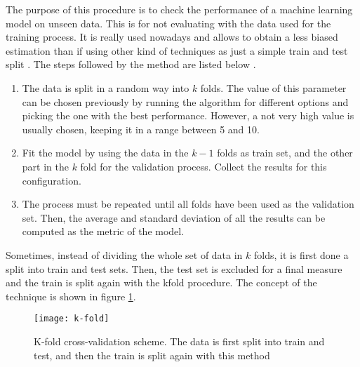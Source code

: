 	The purpose of this procedure is to check the performance of a machine learning model on unseen data. This is for not evaluating with the data used for the training process. It is really used nowadays and allows to obtain a less biased estimation than if using other kind of techniques as just a simple train and test split \cite{Browniee2018}. The steps followed by the method are listed below \cite{M2018}.
	
	\begin{enumerate}
		\item The data is split in a random way into $k$ folds. The value of this parameter can be chosen previously by running the algorithm for different options and picking the one with the best performance. However, a not very high value is usually chosen, keeping it in a range between 5 and 10.
		\item Fit the model by using the data in the $k - 1$ folds as train set, and the other part in the $k$ fold for the validation process. Collect the results for this configuration.
		\item The process must be repeated until all folds have been used as the validation set. Then, the average and standard deviation of all the results can be computed as the metric of the model. 
	\end{enumerate}

	Sometimes, instead of dividing the whole set of data in $k$ folds, it is first done a split into train and test sets. Then, the test set is excluded for a final measure and the train is split again with the \acrlong{kfold} procedure. The concept of the technique is shown in figure \ref{fig:mesh16}.
	
	\begin{figure}[ht]
		\centering
		\captionsetup{justification=centering}
		\texttt{[image: k-fold]}
		\caption{K-fold cross-validation scheme. The data is first split into train and test, and then the train is split again with this method \cite{Scikit-learna}}
		\label{fig:mesh16}
	\end{figure}

	